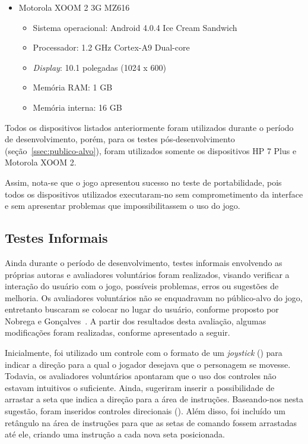 \begin{itemize}
	\item Motorola XOOM 2 3G MZ616
	\begin{itemize}
		\item Sistema operacional: Android 4.0.4 Ice Cream Sandwich
		\item Processador: 1.2 GHz Cortex-A9 Dual-core 
		\item \textit{Display}: 10.1 polegadas (1024 x 600)
		\item Memória RAM: 1 GB
		\item Memória interna: 16 GB
\end{itemize}
\end{itemize}

Todos os dispositivos listados anteriormente foram utilizados durante o período de desenvolvimento, porém, para os testes pós-desenvolvimento (seção~\ref{ssec:publico-alvo}), foram utilizados somente os dispositivos  HP 7 Plus e Motorola XOOM 2. 

Assim, nota-se que o jogo apresentou sucesso no teste de portabilidade, pois todos os dispositivos utilizados executaram-no sem comprometimento da interface e sem apresentar problemas que impossibilitassem o uso do jogo. 

\subsection{Testes Informais} \label{ssec:informais}

Ainda durante o período de desenvolvimento, testes informais envolvendo as próprias autoras e avaliadores voluntários foram realizados, visando verificar a interação do usuário com o jogo, possíveis problemas, erros ou sugestões de melhoria. Os avaliadores voluntários não se enquadravam no público-alvo do jogo, entretanto buscaram se colocar no lugar do usuário, conforme proposto por Nobrega e Gonçalves~\cite{nobrega_metodo_2013}. A partir dos resultados desta avaliação, algumas modificações foram realizadas, conforme apresentado a seguir.

Inicialmente, foi utilizado um controle com o formato de um \textit{joystick} () para indicar a direção para a qual o jogador desejava que o personagem se movesse. Todavia, os avaliadores voluntários apontaram que o uso dos controles não estavam intuitivos o suficiente. Ainda, sugeriram inserir a possibilidade de arrastar a seta que indica a direção para a área de instruções. Baseando-nos nesta sugestão, foram inseridos controles direcionais (). Além disso, foi incluído um retângulo na área de instruções para que as setas de comando fossem arrastadas até ele, criando uma instrução a cada nova seta posicionada.

